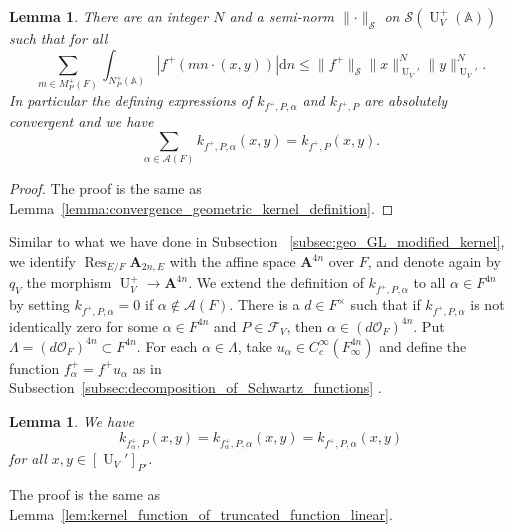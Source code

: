 \documentclass[letterpaper,11pt]{amsart}
\newcommand{\bA}{\mathbb{A}}
\newcommand{\cA}{\mathcal{A}}
\newcommand{\cF}{\mathcal{F}}
\newcommand{\cO}{\mathcal{O}}
\newcommand{\cS}{\mathcal{S}}
\newcommand{\rd}{\mathrm{d}}
\newcommand{\<}{\negthickspace}
\providecommand{\aabs}[1]{\lVert#1\rVert}
\providecommand{\Abs}[1]{\left\lvert#1\right\rvert}
\DeclareMathOperator{\U}{U}
\DeclareMathOperator{\Res}{Res}
\theoremstyle{definition}
\theoremstyle{plain}
\newtheorem{lemma}[definition]{Lemma}
\theoremstyle{remark}
\numberwithin{equation}{section}
\begin{document}
\begin{lemma}
There are an integer $N$ and a semi-norm $\aabs{\cdot}_{\cS}$ on
$\cS(\U_V^+(\bA))$ such that for all
    \[
    \sum_{m \in M_P^+(F)}
    \int_{N_P^+(\bA)} \Abs{f^+(mn \cdot (x,y))} \rd n
    \leq \aabs{f^+}_{\cS} \aabs{x}_{\U_V'}^N \aabs{y}_{\U_V'}^N.
    \]
In particular the defining expressions of $k_{f^+, P,\alpha}$ and $k_{f^+,
P}$ are absolutely convergent and we have
    \[
    \sum_{\alpha \in \cA(F)} k_{f^+,P, \alpha}(x, y) = k_{f^+, P}(x, y).
    \]
\end{lemma}

\begin{proof}
The proof is the same as
Lemma~\ref{lemma:convergence_geometric_kernel_definition}.
\end{proof}

Similar to what we have done in Subsection ~\ref{subsec:geo_GL_modified_kernel}, we identify $\Res_{E/F} \mathbf{A}_{2n, E}$ with the affine space $\mathbf{A}^{4n}$ over $F$, and denote again by $q_V$ the morphism $\U_V^+ \to \mathbf{A}^{4n}$. We extend the definition of $k_{f^+, P, \alpha}$ to all $\alpha \in F^{4n}$ by setting $k_{f^+, P, \alpha} = 0$ if $\alpha \not\in \cA(F)$.
There is a $d \in F^\times$ such that if $k_{f^+, P, \alpha}$ is not identically zero for some $\alpha \in
F^{4n}$ and $P \in \cF_V$, then $\alpha \in (d\cO_F)^{4n}$. Put $\Lambda = (d\cO_F)^{4n} \subset F^{4n}$. For each
$\alpha \in \Lambda$, take $u_{\alpha} \in C_c^\infty(F^{4n}_\infty)$ and define
the function $f^+_\alpha = f^+ u_{\alpha}$ as in
Subsection~\ref{subsec:decomposition_of_Schwartz_functions} .

\begin{lemma}   \label{lem:kernel_function_of_truncated_function_U}
We have
    \[
    k_{f^+_{\alpha}, P}(x, y) =
    k_{f^+_{\alpha}, P, \alpha}(x, y) = k_{f^+, P, \alpha}(x, y)
    \]
for all $x, y \in [\U_V']_{P'}$.
\end{lemma}

The proof is the same as
Lemma~\ref{lem:kernel_function_of_truncated_function_linear}.
\end{document}

